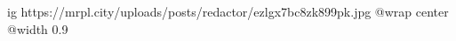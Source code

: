  
 
 
 
 

\ifcmt
  ig https://mrpl.city/uploads/posts/redactor/ezlgx7bc8zk899pk.jpg
  @wrap center
  @width 0.9
\fi
